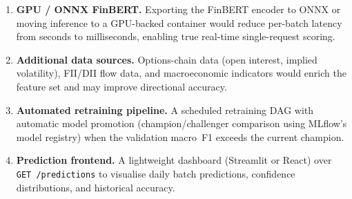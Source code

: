 \documentclass[11pt,a4paper]{article}
\begin{document}
\begin{enumerate}


  \item \textbf{GPU / ONNX FinBERT.} Exporting the FinBERT encoder to ONNX
        or moving inference to a GPU-backed container would reduce per-batch
        latency from seconds to milliseconds, enabling true real-time
        single-request scoring.

  \item \textbf{Additional data sources.} Options-chain data (open interest,
        implied volatility), FII/DII flow data, and macroeconomic indicators
        would enrich the feature set and may improve directional accuracy.

  \item \textbf{Automated retraining pipeline.} A scheduled retraining DAG
        with automatic model promotion (champion/challenger comparison using
        MLflow's model registry) when the validation macro~F1 exceeds the
        current champion.

  \item \textbf{Prediction frontend.} A lightweight dashboard (Streamlit or
        React) over \texttt{GET /predictions} to visualise daily batch
        predictions, confidence distributions, and historical accuracy.

\end{enumerate}


\end{document}

